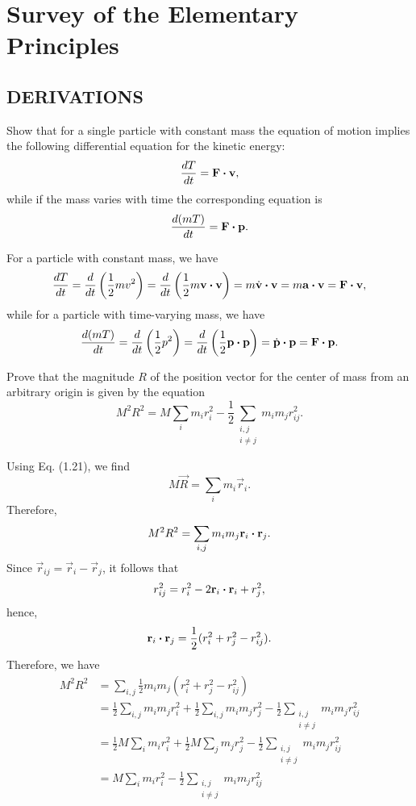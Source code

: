 \section{Survey of the Elementary Principles}

\begin{questions}

\subsection*{DERIVATIONS}

\question Show that for a single particle with constant mass the equation of motion implies the following differential equation for the kinetic energy:
\[
\frac{dT}{dt} = \bm{\mathbf{F}} \boldsymbol{\cdot} \bm{\mathbf{v}},
\]
while if the mass varies with time the corresponding equation is
\[
\frac{d(mT)}{dt} = \bm{\mathbf{F}} \boldsymbol{\cdot} \bm{\mathbf{p}}.
\]
\begin{solution}
For a particle with constant mass, we have 
\[
\frac{dT}{dt} = \frac{d}{dt} \left( \frac{1}{2} mv^2 \right) = \frac{d}{dt} \left( \frac{1}{2} m \bm{\mathbf{v}} \boldsymbol{\cdot} \bm{\mathbf{v}} \right) = m \dot{\bm{\mathbf{v}}} \boldsymbol{\cdot} \bm{\mathbf{v}} = m \bm{\mathbf{a}} \boldsymbol{\cdot} \bm{\mathbf{v}} = \bm{\mathbf{F}} \boldsymbol{\cdot} \bm{\mathbf{v}},
\]
while for a particle with time-varying mass, we have
\[
\frac{d(mT)}{dt} = \frac{d}{dt} \left( \frac{1}{2} p^2 \right) = \frac{d}{dt} \left( \frac{1}{2} \bm{\mathbf{p}} \boldsymbol{\cdot} \bm{\mathbf{p}} \right) = \dot{\bm{\mathbf{p}}} \boldsymbol{\cdot} \bm{\mathbf{p}} = \bm{\mathbf{F}} \boldsymbol{\cdot} \bm{\mathbf{p}}.
\]
\end{solution}

\question Prove that the magnitude $R$ of the position vector for the center of mass from an arbitrary origin is given by the equation
\[
M^2 R^2 = M \sum_i m_i r_i^2 - \frac{1}{2} \sum_{\substack {i, j \\ i \neq j}} m_i m_j r_{ij}^2.
\]
\begin{solution}
Using Eq. (1.21), we find
\[
M \vec{R} = \sum_i m_i \vec{r}_i.
\]
Therefore,
\[
M^2 R^2 = \sum_{i, j} m_i m_j \bm{\mathbf{r}}_i \boldsymbol{\cdot} \bm{\mathbf{r}}_j.
\]
Since $\vec{r}_{ij} = \vec{r}_i - \vec{r}_j$, it follows that
\[
r_{ij}^2 = r_i^2 - 2 \bm{\mathbf{r}}_i \boldsymbol{\cdot} \bm{\mathbf{r}}_i + r_j^2,
\]
hence,
\[
\bm{\mathbf{r}}_i \boldsymbol{\cdot} \bm{\mathbf{r}}_j = \frac{1}{2} ( r_i^2 + r_j^2 - r_{ij}^2 ).
\]
Therefore, we have
\begin{align*}
M^2 R^2 &= \sum_{i, j} \frac{1}{2} m_i m_j ( r_i^2 + r_j^2 - r_{ij}^2 ) \\
&= \frac{1}{2} \sum_{i, j} m_i m_j r_i^2 + \frac{1}{2} \sum_{i, j} m_i m_j r_j^2 - \frac{1}{2} \sum_{\substack{i, j\\i \neq j}} m_i m_j r_{ij}^2 \\
&= \frac{1}{2} M \sum_i m_i r_i^2 + \frac{1}{2} M \sum_j m_j r_j^2 - \frac{1}{2} \sum_{\substack{i, j\\i \neq j}} m_i m_j r_{ij}^2 \\
&= M \sum_i m_i r_i^2 - \frac{1}{2} \sum_{\substack{i, j\\i \neq j}} m_i m_j r_{ij}^2
\end{align*}
\end{solution}


\end{questions}
